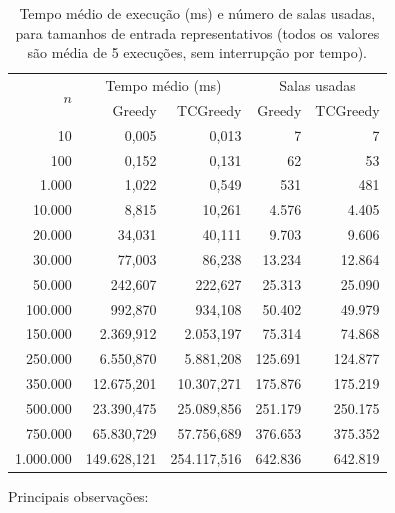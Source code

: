 \documentclass[12pt]{article}
\begin{document}
\begin{table}[ht]
\centering
\caption{Tempo médio de execução (ms) e número de salas usadas, para
  tamanhos de entrada representativos (todos os valores são média de 5
  execuções, sem interrupção por tempo).}
\label{tab:resultados}
\begin{tabular}{r|rr|rr}
\hline
\multirow{2}{*}{$n$} & \multicolumn{2}{c|}{Tempo médio (ms)} & \multicolumn{2}{c}{Salas usadas} \\
 & Greedy & TCGreedy & Greedy & TCGreedy \\
\hline
10      & 0,005      & 0,013      & 7       & 7       \\
100     & 0,152      & 0,131      & 62      & 53      \\
1.000   & 1,022      & 0,549      & 531     & 481     \\
10.000  & 8,815      & 10,261     & 4.576   & 4.405   \\
20.000  & 34,031     & 40,111     & 9.703   & 9.606   \\
30.000  & 77,003     & 86,238     & 13.234  & 12.864  \\
50.000  & 242,607    & 222,627    & 25.313  & 25.090  \\
100.000 & 992,870    & 934,108    & 50.402  & 49.979  \\
150.000 & 2.369,912  & 2.053,197  & 75.314  & 74.868  \\
250.000 & 6.550,870  & 5.881,208  & 125.691 & 124.877 \\
350.000 & 12.675,201 & 10.307,271 & 175.876 & 175.219 \\
500.000 & 23.390,475 & 25.089,856 & 251.179 & 250.175 \\
750.000 & 65.830,729 & 57.756,689 & 376.653 & 375.352 \\
1.000.000 & 149.628,121 & 254.117,516 & 642.836 & 642.819 \\
\hline
\end{tabular}
\end{table}

Principais observações:
\end{document}
